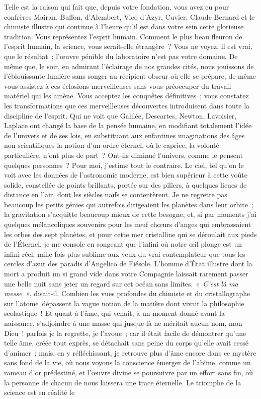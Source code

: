 \documentclass[french,twoside]{book} %
\newcommand\orgName[1]{#1}
\newcommand\persName[1]{#1}
\begin{document}
Telle est la raison qui fait que, depuis votre fondation, vous avez eu pour confrères {\persName Mairan}, {\persName Buffon}, {\persName d’Alembert}, {\persName Vicq d’Azyr}, {\persName Cuvier}, {\persName Claude Bernard} et le chimiste illustre qui continue à l’heure qu’il est dans votre sein cette glorieuse tradition. Vous représentez l’esprit humain. Comment le plus beau fleuron de l’esprit humain, la science, vous serait-elle étrangère ? Vous ne voyez, il est vrai, que le résultat ; l’œuvre pénible du laboratoire n’est pas votre domaine. De même que, le soir, en admirant l’éclairage de nos grandes cités, nous jouissons de l’éblouissante lumière sans songer au récipient obscur où elle se prépare, de même vous assistez à ces éclosions merveilleuses sans vous préoccuper du travail matériel qui les amène. Vous acceptez les conquêtes définitives ; vous constatez les transformations que ces merveilleuses découvertes introduisent dans toute la discipline de l’esprit. Qui ne voit que {\persName Galilée}, {\persName Descartes}, {\persName Newton}, {\persName Lavoisier}, {\persName Laplace} ont changé la base de la pensée humaine, en modifiant totalement l’idée de l’univers et de ses lois, en substituant aux enfantines imaginations des âges non scientifiques la notion d’un ordre éternel, où le caprice, la volonté particulière, n’ont plus de part ? Ont-ils diminué l’univers, comme le pensent quelques personnes ? Pour moi, j’estime tout le contraire. Le ciel, tel qu’on le voit avec les données de l’astronomie moderne, est bien supérieur à cette voûte solide, constellée de points brillants, portée sur des piliers, à quelques lieues de distance en l’air, dont les siècles naïfs se contentèrent. Je ne regrette pas beaucoup les petits génies qui autrefois dirigeaient les planètes dans leur orbite ; la gravitation s’acquitte beaucoup mieux de cette besogne, et, si par moments j’ai quelques mélancoliques souvenirs pour les neuf chœurs d’anges qui embrassaient les orbes des sept planètes, et pour cette mer cristalline qui se déroulait aux pieds de {\persName l’Éternel}, je me console en songeant que l’infini où notre œil plonge est un infini réel, mille fois plus sublime aux yeux du vrai contemplateur que tous les cercles d’azur des paradis d’{\persName Angelico de Fiésole}. L’homme d’État illustre dont la mort a produit un si grand vide dans votre {\orgName Compagnie} laissait rarement passer une belle nuit sans jeter un regard sur cet océan sans limites. \emph{« C’est là ma messe »}, disait-il. Combien les vues profondes du chimiste et du cristallographe sur l’atome dépassent la vague notion de la matière dont vivait la philosophie scolastique ! Et quant à l’âme, qui venait, à un moment donné avant la naissance, s’adjoindre à une masse qui jusque-là ne méritait aucun nom, mon Dieu ! parfois je la regrette, je l’avoue ; car il était facile de démontrer qu’une telle âme, créée tout exprès, se détachait sans peine du corps qu’elle avait cessé d’animer ; mais, en y réfléchissant, je retrouve plus d’âme encore dans ce mystère sans fond de la vie, où nous voyons la conscience émerger de l’abîme, comme un rameau d’or prédestiné, et l’œuvre divine se poursuivre par un effort sans fin, où la personne de chacun de nous laissera une trace éternelle. Le triomphe de la science est en réalité le 
\end{document}
